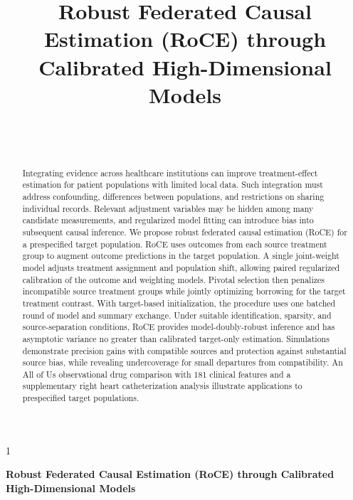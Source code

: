 \documentclass[12pt]{article}
\providecommand{\anon}{1}
\begin{document}
\def\spacingset#1{\renewcommand{\baselinestretch}{#1}\small\normalsize}
\spacingset{1}

\title{\bf Robust Federated Causal Estimation (RoCE) through Calibrated High-Dimensional Models}
\anon
  \author{\FACEHDAuthors\\[0.5em]\small \FACEHDAffiliationLineOne\\\small \FACEHDAffiliationLineTwo}
  \maketitle
\else
  \bigskip
  \bigskip
  \bigskip
  \begin{center}
    {\LARGE\bf Robust Federated Causal Estimation (RoCE) through Calibrated High-Dimensional Models}
  \end{center}
  \medskip
\fi

\bigskip
\begin{abstract}
Integrating evidence across healthcare institutions can improve treatment-effect estimation for patient populations with limited local data. Such integration must address confounding, differences between populations, and restrictions on sharing individual records. Relevant adjustment variables may be hidden among many candidate measurements, and regularized model fitting can introduce bias into subsequent causal inference. We propose robust federated causal estimation (RoCE) for a prespecified target population. RoCE uses outcomes from each source treatment group to augment outcome predictions in the target population. A single joint-weight model adjusts treatment assignment and population shift, allowing paired regularized calibration of the outcome and weighting models. Pivotal selection then penalizes incompatible source treatment groups while jointly optimizing borrowing for the target treatment contrast. With target-based initialization, the procedure uses one batched round of model and summary exchange. Under suitable identification, sparsity, and source-separation conditions, RoCE provides model-doubly-robust inference and has asymptotic variance no greater than calibrated target-only estimation. Simulations demonstrate precision gains with compatible sources and protection against substantial source bias, while revealing undercoverage for small departures from compatibility. An All of Us observational drug comparison with 181 clinical features and a supplementary right heart catheterization analysis illustrate applications to prespecified target populations.
\end{abstract}
\end{document}
